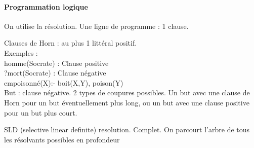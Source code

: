 \documentclass[french]{article}
\begin{document}
\paragraph{Programmation logique}
On utilise la résolution. Une ligne de programme : 1 clause.

Clauses de Horn : au plus 1 littéral positif.\\
Exemples : \\
homme(Socrate) : Clause positive\\
?mort(Socrate) : Clause négative\\
empoisonné(X):- boit(X,Y), poison(Y)\\

But : clause négative. 2 types de coupures possibles. Un but avec une clause de Horn pour un but éventuellement plus long, ou un but avec une clause positive pour un but plus court.

SLD (selective linear definite) resolution. Complet. On parcourt l'arbre de tous les résolvants possibles en profondeur
\end{document}
